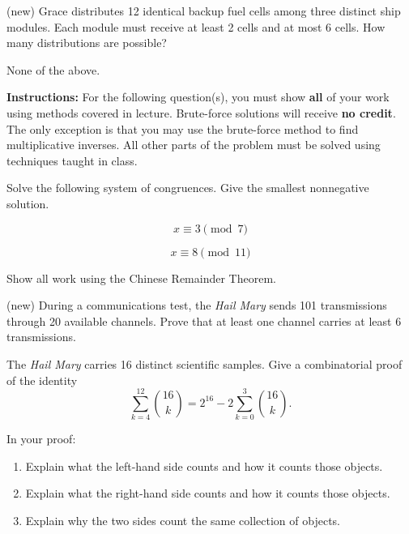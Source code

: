 \documentclass[11pt,addpoints]{exam}
\begin{document}
\begin{questions}
\question[5] (new) Grace distributes 12 identical backup fuel cells among three distinct ship modules. Each module must receive at least 2 cells and at most 6 cells. How many distributions are possible?

\begin{choices}
    \choice None of the above.
\end{choices}


\newpage
\textbf{Instructions:} For the following question(s), you must show \textbf{all} of your work using methods covered in lecture. Brute-force solutions will receive \textbf{no credit}. The only exception is that you may use the brute-force method to find multiplicative inverses. All other parts of the problem must be solved using techniques taught in class.


\question[13] Solve the following system of congruences. Give the smallest nonnegative solution.

\[
x \equiv 3 \pmod{7}
\]

\[
x \equiv 8 \pmod{11}
\]

Show all work using the Chinese Remainder Theorem.


\newpage

\question[13] (new) During a communications test, the \textit{Hail Mary} sends 101 transmissions through 20 available channels. Prove that at least one channel carries at least 6 transmissions.

\newpage

\question[14] The \textit{Hail Mary} carries 16 distinct scientific samples. Give a combinatorial proof of the identity
\[
\sum_{k=4}^{12}\binom{16}{k}
=
2^{16}-2\sum_{k=0}^{3}\binom{16}{k}.
\]

In your proof:
\begin{enumerate}[label=\arabic*.]
    \item Explain what the left-hand side counts and how it counts those objects.
    \item Explain what the right-hand side counts and how it counts those objects.
    \item Explain why the two sides count the same collection of objects.
\end{enumerate}



\end{questions}
\end{document}
